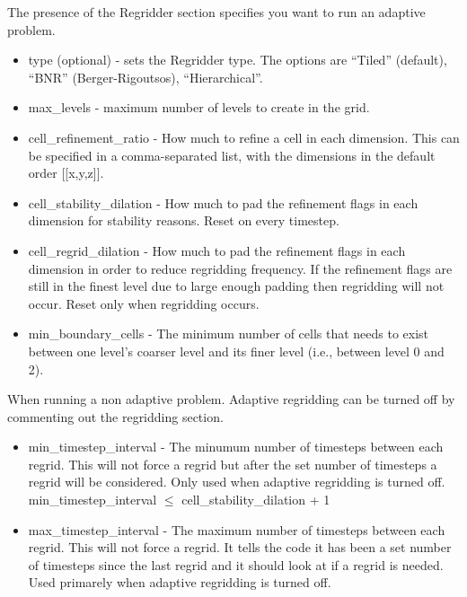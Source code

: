 The presence of the Regridder section specifies you want to run an
adaptive problem.
\begin{itemize}
  \item type (optional) - sets the Regridder type. The options are
   ``Tiled'' (default), ``BNR'' (Berger-Rigoutsos), ``Hierarchical''.
 \item max\_levels - maximum number of levels to create in the grid. 
 \item cell\_refinement\_ratio - How much to refine a cell in each
   dimension. This can be specified in a comma-separated list, with the dimensions in the default order [[x,y,z]].
    \item cell\_stability\_dilation - How much to pad the refinement flags
   in each dimension for stability reasons.  Reset on every timestep. 
 \item cell\_regrid\_dilation - How much to pad the refinement flags in
   each dimension in order to reduce regridding frequency. If the refinement flags are still in the finest level due to large enough padding then regridding will not occur. Reset only when regridding occurs.  
 \item min\_boundary\_cells - The minimum number of cells that needs to
   exist between one level's coarser level and its finer level (i.e.,
   between level 0 and 2).
\end{itemize}

When running a non adaptive problem. Adaptive regridding can be turned off by commenting out the regridding section.
\begin{itemize}
  \item min\_timestep\_interval - The minumum number of timesteps between each regrid. This will not force a regrid but after the set number of timesteps a regrid will be considered. Only used when adaptive regridding is turned off. min\_timestep\_interval $\leq$ cell\_stability\_dilation + 1 
  \item max\_timestep\_interval - The maximum number of timesteps between each regrid.  This will not force a regrid.
 It tells the code it has been a set number of timesteps since the last regrid and it should look at if a regrid is needed. Used primarely when adaptive regridding is turned off.
\end{itemize}



